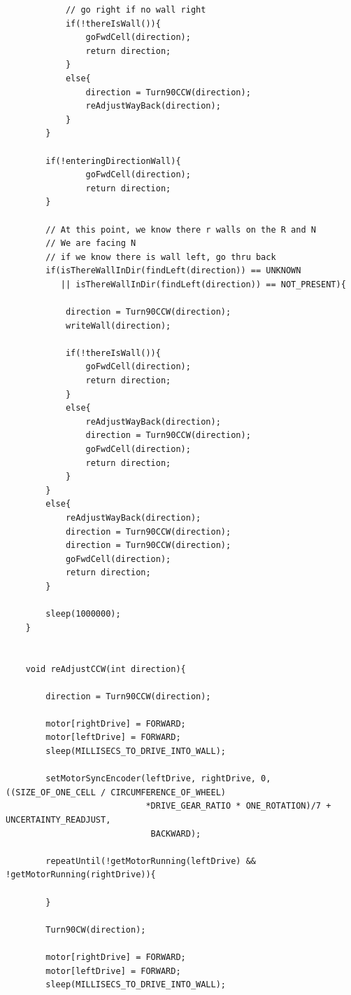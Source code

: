 \documentclass[11pt]{article}
\begin{document}
\begin{linenumbers}
\begin{verbatim}
            // go right if no wall right
            if(!thereIsWall()){
                goFwdCell(direction);
                return direction;
            }
            else{
                direction = Turn90CCW(direction);
                reAdjustWayBack(direction);
            }
        }		
        
        if(!enteringDirectionWall){
                goFwdCell(direction);
                return direction;
        }
        
        // At this point, we know there r walls on the R and N
        // We are facing N 
        // if we know there is wall left, go thru back
        if(isThereWallInDir(findLeft(direction)) == UNKNOWN 
           || isThereWallInDir(findLeft(direction)) == NOT_PRESENT){
           
            direction = Turn90CCW(direction);
            writeWall(direction);
                            
            if(!thereIsWall()){
                goFwdCell(direction);
                return direction;
            }
            else{
                reAdjustWayBack(direction);
                direction = Turn90CCW(direction);
                goFwdCell(direction);
                return direction;
            }	
        }
        else{
            reAdjustWayBack(direction);
            direction = Turn90CCW(direction);
            direction = Turn90CCW(direction);
            goFwdCell(direction);
            return direction;
        }
        
        sleep(1000000);
    }


    void reAdjustCCW(int direction){

        direction = Turn90CCW(direction);

        motor[rightDrive] = FORWARD;
        motor[leftDrive] = FORWARD;
        sleep(MILLISECS_TO_DRIVE_INTO_WALL);

        setMotorSyncEncoder(leftDrive, rightDrive, 0, ((SIZE_OF_ONE_CELL / CIRCUMFERENCE_OF_WHEEL)
                            *DRIVE_GEAR_RATIO * ONE_ROTATION)/7 + UNCERTAINTY_READJUST,
                             BACKWARD);

        repeatUntil(!getMotorRunning(leftDrive) && !getMotorRunning(rightDrive)){

        }

        Turn90CW(direction);

        motor[rightDrive] = FORWARD;
        motor[leftDrive] = FORWARD;
        sleep(MILLISECS_TO_DRIVE_INTO_WALL);


\end{verbatim}
\end{linenumbers}
\end{document}
